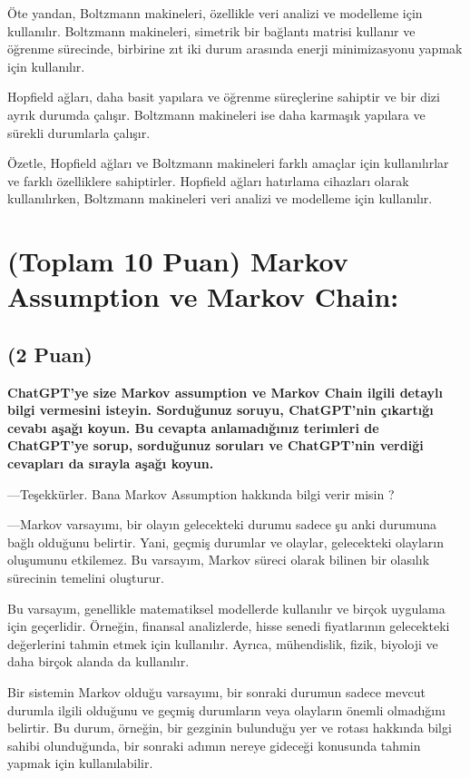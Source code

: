 \documentclass[11pt]{article}
\begin{document}
Öte yandan, Boltzmann makineleri, özellikle veri analizi ve modelleme için kullanılır. Boltzmann makineleri, simetrik bir bağlantı matrisi kullanır ve öğrenme sürecinde, birbirine zıt iki durum arasında enerji minimizasyonu yapmak için kullanılır.

Hopfield ağları, daha basit yapılara ve öğrenme süreçlerine sahiptir ve bir dizi ayrık durumda çalışır. Boltzmann makineleri ise daha karmaşık yapılara ve sürekli durumlarla çalışır.

Özetle, Hopfield ağları ve Boltzmann makineleri farklı amaçlar için kullanılırlar ve farklı özelliklere sahiptirler. Hopfield ağları hatırlama cihazları olarak kullanılırken, Boltzmann makineleri veri analizi ve modelleme için kullanılır.


\newpage

\section{(Toplam 10 Puan) Markov Assumption ve Markov Chain:}

\subsection{(2 Puan)} \textbf{ChatGPT’ye size Markov assumption ve Markov Chain ilgili detaylı bilgi vermesini isteyin. Sorduğunuz soruyu, ChatGPT'nin çıkartığı cevabı aşağı koyun. Bu cevapta anlamadığınız terimleri de ChatGPT’ye sorup, sorduğunuz soruları ve ChatGPT’nin verdiği cevapları da sırayla aşağı koyun.}

---Teşekkürler. Bana Markov Assumption hakkında bilgi verir misin ?

---Markov varsayımı, bir olayın gelecekteki durumu sadece şu anki durumuna bağlı olduğunu belirtir. Yani, geçmiş durumlar ve olaylar, gelecekteki olayların oluşumunu etkilemez. Bu varsayım, Markov süreci olarak bilinen bir olasılık sürecinin temelini oluşturur.

Bu varsayım, genellikle matematiksel modellerde kullanılır ve birçok uygulama için geçerlidir. Örneğin, finansal analizlerde, hisse senedi fiyatlarının gelecekteki değerlerini tahmin etmek için kullanılır. Ayrıca, mühendislik, fizik, biyoloji ve daha birçok alanda da kullanılır.

Bir sistemin Markov olduğu varsayımı, bir sonraki durumun sadece mevcut durumla ilgili olduğunu ve geçmiş durumların veya olayların önemli olmadığını belirtir. Bu durum, örneğin, bir gezginin bulunduğu yer ve rotası hakkında bilgi sahibi olunduğunda, bir sonraki adımın nereye gideceği konusunda tahmin yapmak için kullanılabilir.
\end{document}
